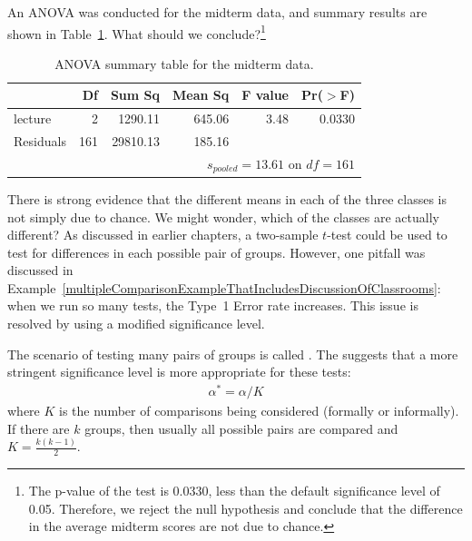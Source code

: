 \begin{exercise} \label{exerExaminingAnovaSummaryTableForMidtermData}
An ANOVA was conducted for the midterm data, and summary results are shown in Table~\ref{anovaSummaryTableForMidtermData}. What should we conclude?\footnote{The p-value of the test is 0.0330, less than the default significance level of 0.05. Therefore, we reject the null hypothesis and conclude that the difference in the average midterm scores are not due to chance.}\textA{\vspace{-3mm}}
\end{exercise}

\begin{table}[hhh]
\centering
\begin{tabular}{lrrrrr}
  \hline
 & Df & Sum Sq & Mean Sq & F value & Pr($>$F) \\
  \hline
lecture & 2 & 1290.11 & 645.06 & 3.48 & 0.0330 \\
  Residuals & 161 & 29810.13 & 185.16 &  &  \\
   \hline
\multicolumn{6}{r}{$s_{pooled}=13.61$ on $df=161$}
\end{tabular}
\caption{ANOVA summary table for the midterm data.}
\label{anovaSummaryTableForMidtermData}
\end{table}

There is strong evidence that the different means in each of the three classes is not simply due to chance. We might wonder, which of the classes are actually different? As discussed in earlier chapters, a two-sample $t$-test could be used to test for differences in each possible pair of groups. However, one pitfall was discussed in Example~\vref{multipleComparisonExampleThatIncludesDiscussionOfClassrooms}: when we run so many tests, the Type~1 Error rate increases. This issue is resolved by using a modified significance level.

\begin{termBox}{
The scenario of testing many pairs of groups is called . The  suggests that a more stringent significance level is more appropriate for these tests:
\begin{align*}
\alpha^* = \alpha / K
\end{align*}
where $K$ is the number of comparisons being considered (formally or informally). If there are $k$ groups, then usually all possible pairs are compared and $K=\frac{k(k-1)}{2}$.}
\end{termBox}

